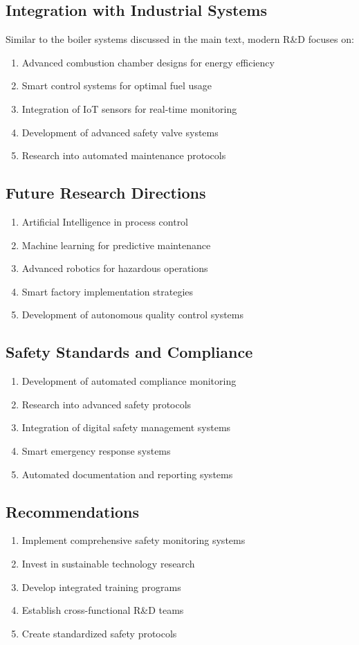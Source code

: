 \subsection{Integration with Industrial Systems}
Similar to the boiler systems discussed in the main text, modern R\&D focuses on:
\begin{enumerate}
\item Advanced combustion chamber designs for energy efficiency
\item Smart control systems for optimal fuel usage
\item Integration of IoT sensors for real-time monitoring
\item Development of advanced safety valve systems
\item Research into automated maintenance protocols
\end{enumerate}
\subsection{Future Research Directions}
\begin{enumerate}
\item Artificial Intelligence in process control
\item Machine learning for predictive maintenance
\item Advanced robotics for hazardous operations
\item Smart factory implementation strategies
\item Development of autonomous quality control systems
\end{enumerate}
\subsection{Safety Standards and Compliance}
\begin{enumerate}
\item Development of automated compliance monitoring
\item Research into advanced safety protocols
\item Integration of digital safety management systems
\item Smart emergency response systems
\item Automated documentation and reporting systems
\end{enumerate}
\subsection{Recommendations}
\begin{enumerate}
\item Implement comprehensive safety monitoring systems
\item Invest in sustainable technology research
\item Develop integrated training programs
\item Establish cross-functional R\&D teams
\item Create standardized safety protocols
\end{enumerate}